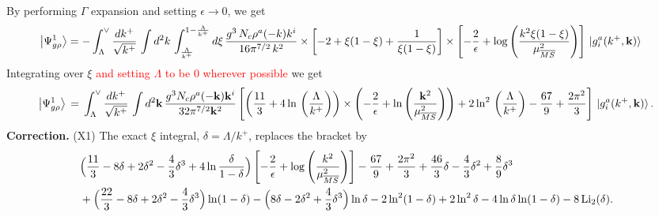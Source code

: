 \documentclass[aps,prd,amsmath,amssymb,nofootinbib]{revtex4-2}
\numberwithin{equation}{section}
\begin{document}
By performing $\Gamma$ expansion and setting $\epsilon \rightarrow 0$, we get
\begin{align}
     \left|\Psi_{g\rho}^{1}\right\rangle & = - \int_{\Lambda}^{\vee} \frac{dk^{+}}{\sqrt{k^{+}}} \,\int d^{2}k\, \int_{\frac{\Lambda}{k^{+}}}^{1-\frac{\Lambda}{k^{+}}} d\xi\, \frac{g^{3}\,N_{c}\rho^{a}(-k) k^{i}}{16\pi^{7/2}\,k^{2}}\times \left[-2+\xi(1-\xi)+\frac{1}{\xi(1-\xi)}\right]\times \left[-\frac{2}{\epsilon}+\log{\left(\frac{k^{2}\xi(1-\xi)}{\mu^{2}_{\overline{MS}}}\right)}\right]\, \ket{g^{a}_{i}(k^{+},\mathbf{k})}
\end{align}
Integrating over $\xi$ \textcolor{red}{and setting $\Lambda$ to be $0$ wherever possible} we get\\
\begin{align}\label{gtwoloop1}
\left|\Psi_{g\rho}^{1}\right\rangle\,=\,\int_{\Lambda}^{\vee}\frac{dk^{+}}{\sqrt{k^{+}}}\,\int d^{2}\mathbf{k}\,\frac{g^{3}N_{c}\rho^{a}(-\mathbf{k})\mathbf{k}^{i}}{32\pi^{7/2}\mathbf{k}^{2}}
\left[\left(\frac{11}{3}+4\ln\,\left(\frac{\Lambda}{k^{+}}\right)\right)\times\left(-\frac{2}{\epsilon}+\ln\left(\frac{\mathbf{k}^{2}}{\mu_{\overline{MS}}^{2}}\right)\right)+2\ln^{2}\,\left(\frac{\Lambda}{k^{+}}\right)-\frac{67}{9}+\frac{2\pi^{2}}{3}\right]\, \ket{g^{a}_{i}(k^{+},\mathbf{k})}.
\end{align}
{\color{blue}\noindent\textbf{Correction.} (X1) The exact $\xi$ integral, $\delta=\Lambda/k^+$, replaces the bracket by
\begin{align}
&\Big(\frac{11}{3}-8\delta+2\delta^2-\frac43\delta^3+4\ln\frac{\delta}{1-\delta}\Big)\left[-\frac{2}{\epsilon}+\log{\left(\frac{k^{2}}{\mu^{2}_{\overline{MS}}}\right)}\right]-\frac{67}{9}+\frac{2\pi^2}{3}+\frac{46}{3}\delta-\frac43\delta^2+\frac89\delta^3\notag\\
&+\Big(\frac{22}{3}-8\delta+2\delta^2-\frac43\delta^3\Big)\ln(1-\delta)-\Big(8\delta-2\delta^2+\frac43\delta^3\Big)\ln\delta-2\ln^2(1-\delta)+2\ln^2\delta-4\ln\delta\ln(1-\delta)-8\,{\rm Li}_2(\delta).\notag
\end{align}}
\end{document}
